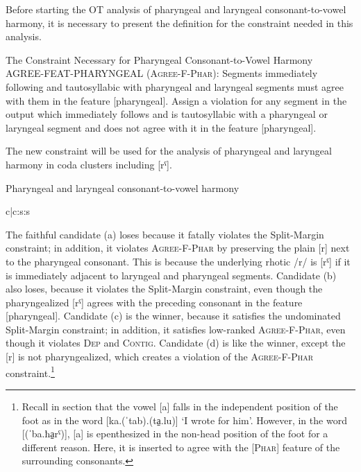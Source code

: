 \documentclass[output=paper,colorlinks,citecolor=brown]{langscibook}
\begin{document}
Before starting the OT analysis of pharyngeal and laryngeal consonant-to-vowel harmony, it is necessary to present the definition for the constraint needed in this analysis. 

\begin{exe} 
\ex \label{connec}
The Constraint Necessary for Pharyngeal Consonant-to-Vowel Harmony\\
AGREE-FEAT-PHARYNGEAL (\textsc{Agree-F-Phar}): Segments immediately following  and tautosyllabic with pharyngeal and laryngeal segments must agree with them  in the feature [pharyngeal]. Assign a violation for any segment in the output which immediately follows and is tautosyllabic with a pharyngeal or laryngeal segment and does not agree with it in the feature [pharyngeal].
\end{exe}
 

The new constraint will be used for the analysis of pharyngeal and laryngeal harmony in coda clusters including [rˤ].

\begin{table}
\caption{Pharyngeal and laryngeal consonant-to-vowel harmony}
\label{tab:pha}
\ShadingOn
\begin{tableau}{c|c:s:s} 
      \const*{*O2L1]σ}    
\cand{[baħr]}              \vio{*!}  \vio{*}  \vio{}    \vio{}
\cand{[baħrˤ]}            \vio{*!}   \vio{}   \vio{}   \vio{}
\cand[\Optimal]{[ba.ħarˤ]}  \vio{}    \vio{} \vio{*}  \vio{*}
\cand{[ba.ħar]}             \vio{}    \vio{*!} \vio{*}  \vio{*}
\end{tableau}
\end{table}


The faithful candidate (a) loses because it fatally violates the Split-Margin constraint; in addition, it violates \textsc{Agree-F-Phar} by preserving the plain [r] next to the pharyngeal consonant. This is because the underlying rhotic /r/ is [rˤ] if it is immediately adjacent to laryngeal and pharyngeal segments. Candidate (b) also loses, because it violates the Split-Margin constraint, even though the pharyngealized [rˤ] agrees with the preceding consonant in the feature [pharyngeal]. Candidate (c) is the winner, because it satisfies the undominated Split-Margin constraint; in  addition, it satisfies low-ranked \textsc{Agree-F-Phar}, even though it violates \textsc{Dep} and \textsc{Contig}. Candidate (d) is like the winner, except the [r] is not pharyngealized, which creates a violation of the \textsc{Agree-F-Phar} constraint.\footnote{Recall
  in section  that the vowel [a] falls in the independent position of the foot as in the word [ka.(ˈtab).(ta̠.lu)] ‘I wrote for him’. However, in the word [(ˈba.ħa̠rˤ)], [a] is epenthesized in the non-head position of the foot for a different reason. Here, it is inserted to agree with the [\textsc{Phar}] feature of the surrounding consonants.
  }
\end{document}
